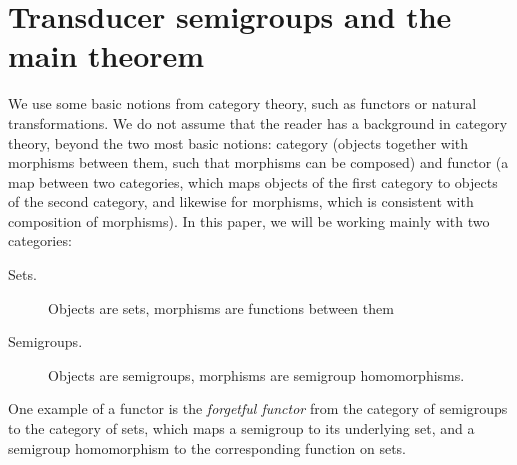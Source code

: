 \section{Transducer semigroups and the main theorem}
We use some basic notions from category theory, such as functors or natural transformations. 
We do not assume that the reader has a background in category theory, beyond the two most basic notions: category (objects together with morphisms between them, such that morphisms can be composed) and functor (a map between two categories, which maps objects of the first category to objects of the second category, and likewise for morphisms, which is consistent with composition of morphisms). In this paper, we will be working mainly with two categories: 
\begin{description}
    \item[Sets.] Objects are sets,  morphisms are functions between them
    \item[Semigroups.] Objects are semigroups,  morphisms are semigroup homomorphisms.
\end{description}

One example of a functor is the \emph{forgetful functor} from the category of semigroups to the category of sets, which maps a semigroup to its underlying set, and a semigroup homomorphism to the corresponding function on sets. 


